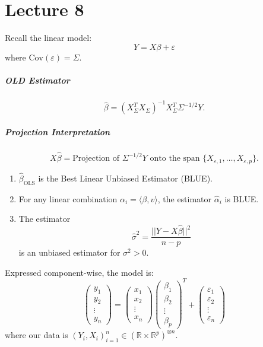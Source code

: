 \documentclass[open=any, 11pt,paper=A4]{scrreprt}
\begin{document}
\chapter{Lecture 8}

Recall the linear model:
\[
Y = X\beta + \varepsilon
\]
where $\text{Cov}(\varepsilon) = \Sigma$.

\paragraph{OLD Estimator}
\[
\hat{\beta} = \left(X_\Sigma^T X_\Sigma\right)^{-1} X_\Sigma^T \Sigma^{-1/2} Y.
\]

\paragraph{Projection Interpretation}
\[
X\hat{\beta} = \text{Projection of } \Sigma^{-1/2} Y \text{ onto the span } \{X_{\varepsilon,1}, \hdots, X_{\varepsilon,p}\}.
\]

\begin{theorem}
\begin{enumerate}
    \item $\hat{\beta}_{\text{OLS}}$ is the Best Linear Unbiased Estimator (BLUE).
    \item For any linear combination $\alpha_i = \langle \beta, v \rangle$, the estimator $\hat{\alpha}_i$ is BLUE.
    \item The estimator 
    \[
    \hat{\sigma}^2 = \frac{||Y - X\hat{\beta}||^2}{n - p}
    \]
    is an unbiased estimator for $\sigma^2 > 0$.
\end{enumerate}
\end{theorem}

Expressed component-wise, the model is:
\[
\begin{pmatrix}  
    y_1  \\  
    y_2 \\ 
    \vdots \\ 
    y_n  
\end{pmatrix}
=
\begin{pmatrix}  
    x_1  \\  
    x_2 \\ 
    \vdots \\ 
    x_n  
\end{pmatrix} 
\begin{pmatrix}  
    \beta_1  \\  
    \beta_2 \\ 
    \vdots \\ 
    \beta_p  
\end{pmatrix}^T 
+
\begin{pmatrix}  
    \varepsilon_1  \\  
    \varepsilon_2 \\ 
    \vdots \\ 
    \varepsilon_n  
\end{pmatrix}
\]
where our data is $(Y_i, X_i)_{i=1}^n \in (\mathbb{R} \times \mathbb{R}^p)^{\otimes n}$.
\end{document}
